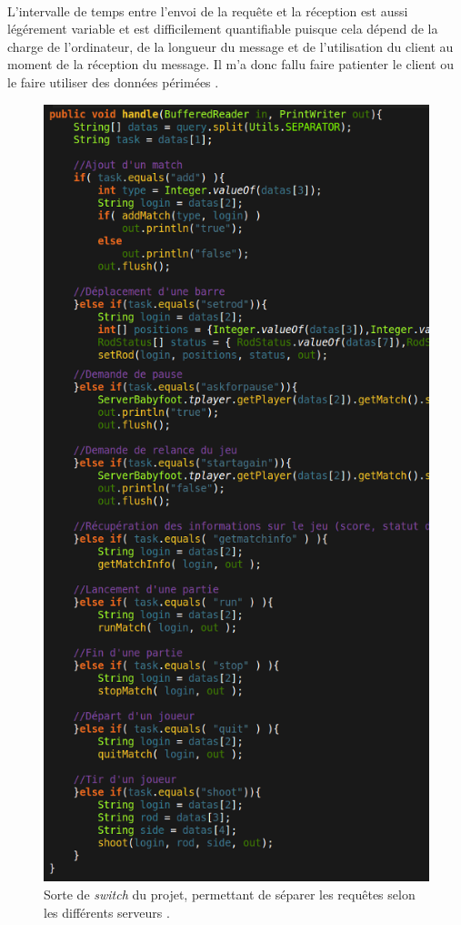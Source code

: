 \documentclass[a4paper,12pt]{report}
\begin{document}
\paragraph{}
L'intervalle de temps entre l'envoi de la requête et la réception est aussi légérement variable et est difficilement quantifiable puisque cela dépend de la charge de l'ordinateur, de la longueur du message et de l'utilisation du client au moment de la réception du message. Il m'a donc fallu faire patienter le client ou le faire utiliser des données \og périmées \fg.
\begin{figure}[H]
	\begin{center}
	\includegraphics[width=12cm]{pictures/switch.png} 
	\end{center}
	\caption{Sorte de \emph{switch} du projet, permettant de séparer les requêtes selon les différents \og serveurs \fg.}
    \end{figure}
\end{document}
